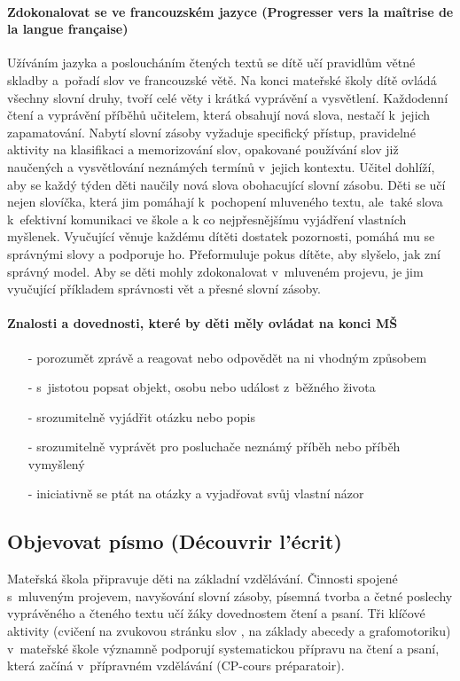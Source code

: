 			\paragraph{Zdokonalovat se ve francouzském jazyce (Progresser vers la maîtrise de la langue française)}
			Užíváním jazyka a posloucháním čtených textů se dítě učí pravidlům větné skladby a pořadí slov ve francouzské větě. Na konci mateřské školy dítě ovládá všechny slovní druhy, tvoří celé věty i krátká vyprávění a vysvětlení. Každodenní čtení a vyprávění příběhů učitelem, která obsahují nová slova, nestačí k jejich zapamatování. Nabytí slovní zásoby vyžaduje specifický přístup, pravidelné aktivity na klasifikaci a memorizování slov, opakované používání slov již naučených a vysvětlování neznámých termínů v jejich kontextu. Učitel dohlíží, aby se každý týden děti naučily nová slova obohacující slovní zásobu. Děti se učí nejen slovíčka, která jim pomáhají k pochopení mluveného textu, ale také slova k efektivní komunikaci ve škole a k co nejpřesnějšímu vyjádření vlastních myšlenek. Vyučující věnuje každému dítěti dostatek pozornosti, pomáhá mu se správnými slovy a podporuje ho. Přeformuluje pokus dítěte, aby slyšelo, jak zní správný model. Aby se děti mohly zdokonalovat v mluveném projevu, je jim vyučující příkladem správnosti vět a přesné slovní zásoby.

			\paragraph{Znalosti a dovednosti, které by děti měly ovládat na konci MŠ}
			\begin{itemize}
				\setlength\itemsep{-2mm}
				\item[-] porozumět zprávě a reagovat nebo odpovědět na ni vhodným způsobem
				\item[-] s jistotou popsat objekt, osobu nebo událost z běžného života
				\item[-] srozumitelně vyjádřit otázku nebo popis
				\item[-] srozumitelně vyprávět pro posluchače neznámý příběh nebo příběh vymyšlený 
				\item[-] iniciativně se ptát na otázky a vyjadřovat svůj vlastní názor
			\end{itemize}


		\subsection{Objevovat písmo (Découvrir l'écrit)}
			Mateřská škola připravuje děti na základní vzdělávání. Činnosti spojené s mluveným projevem, navyšování slovní zásoby, písemná tvorba a četné poslechy vyprávěného a čteného textu učí žáky dovednostem čtení a psaní. Tři klíčové aktivity (cvičení na zvukovou stránku slov , na základy abecedy a grafomotoriku) v mateřské škole významně podporují systematickou přípravu na čtení a psaní, která začíná v přípravném vzdělávání (CP-cours préparatoir).

